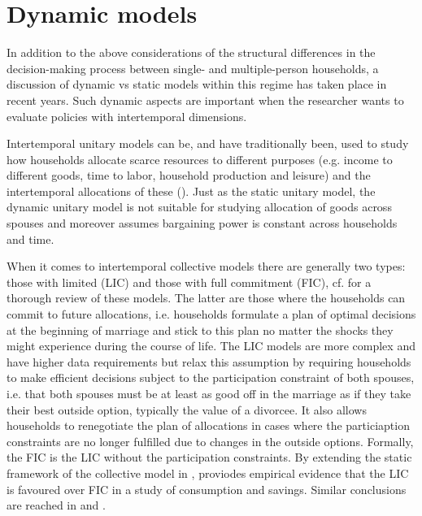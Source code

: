 \section{Dynamic models}
In addition to the above considerations of the structural differences in the decision-making process between single- and multiple-person households, a discussion of dynamic vs static models within this regime has taken place in recent years. Such dynamic aspects are important when the researcher wants to evaluate policies with intertemporal dimensions. 

Intertemporal unitary models can be, and have traditionally been, used to study how households allocate scarce resources to different purposes (e.g. income to different goods, time to labor, household production and leisure) and the intertemporal allocations of these (\cite{Scholzetal2006,KruegerPerri2006}). Just as the static unitary model, the dynamic unitary model is not suitable for studying allocation of goods across spouses and moreover assumes bargaining power is constant across households and time.

When it comes to intertemporal collective models there are generally two types: those with limited (LIC) and those with full commitment (FIC), cf. \cite{ChiapporiMazzocco2015} for a thorough review of these models. The latter are those where the households can commit to future allocations, i.e. households formulate a plan of optimal decisions at the beginning of marriage and stick to this plan no matter the shocks they might experience during the course of life. The LIC models are more complex and have higher data requirements but relax this assumption by requiring households to make efficient decisions subject to the participation constraint of both spouses, i.e. that both spouses must be at least as good off in the marriage as if they take their best outside option, typically the value of a divorcee. It also allows households to renegotiate the plan of allocations in cases where the particiaption constraints are no longer fulfilled due to changes in the outside options. Formally, the FIC is the LIC without the participation constraints. By extending the static framework of the collective model in \cite{Chiappori1988,Chiappori1992}, \cite{Mazzocco2007} proviodes empirical evidence that the LIC is favoured over FIC in a study of consumption and savings. Similar conclusions are reached in \cite{Aura2005} and \cite{LiseYamada2014}.


